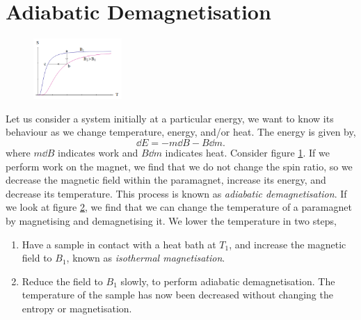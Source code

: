 \documentclass{book}
\begin{document}
\section{Adiabatic Demagnetisation}
\begin{figure}
	\centering
	\caption{}
	\label{fig:magnetisation}
\end{figure}
\begin{figure}
	\centering
	\includegraphics[width=0.3\textwidth]{magnet.png}
	\caption{}
	\label{fig:mag}
\end{figure}
Let us consider a system initially at a particular energy, we want to know its behaviour as we change temperature, energy, and/or heat. The energy is given by,
\begin{equation}
	\dd{E} = - m\dd{B} - B\dd{m}.
\end{equation}
where $m\dd{B}$ indicates work and $B\dd{m}$ indicates heat. Consider figure \ref{fig:magnetisation}. If we perform work on the magnet, we find that we do not change the spin ratio, so we decrease the magnetic field within the paramagnet, increase its energy, and decrease its temperature. This process is known as \textit{adiabatic demagnetisation}. If we look at figure \ref{fig:mag}, we find that we can change the temperature of a paramagnet by magnetising and demagnetising it. We lower the temperature in two steps,
\begin{enumerate}
	\item Have a sample in contact with a heat bath at $T_1$, and increase the magnetic field to $B_1$, known as \textit{isothermal magnetisation}.
	\item Reduce the field to $B_1$ slowly, to perform adiabatic demagnetisation. The temperature of the sample has now been decreased without changing the entropy or magnetisation.
\end{enumerate}
\end{document}

